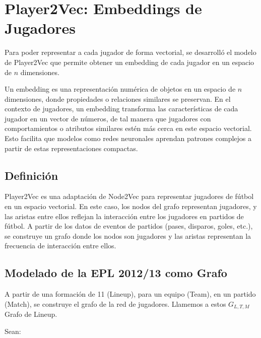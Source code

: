 \documentclass[
  a4paper,
]{article}
\begin{document}
\newpage

\hypertarget{player2vec-embeddings-de-jugadores}{%
\section{\texorpdfstring{\textbf{Player2Vec}: Embeddings de
Jugadores}{Player2Vec: Embeddings de Jugadores}}\label{player2vec-embeddings-de-jugadores}}

Para poder representar a cada jugador de forma vectorial, se desarrolló
el modelo de Player2Vec que permite obtener un embedding de cada jugador
en un espacio de \(n\) dimensiones.

Un embedding es una representación numérica de objetos en un espacio de
\(n\) dimensiones, donde propiedades o relaciones similares se
preservan. En el contexto de jugadores, un embedding transforma las
características de cada jugador en un vector de números, de tal manera
que jugadores con comportamientos o atributos similares estén más cerca
en este espacio vectorial. Esto facilita que modelos como redes
neuronales aprendan patrones complejos a partir de estas
representaciones compactas.

\hypertarget{definiciuxf3n}{%
\subsection{Definición}\label{definiciuxf3n}}

Player2Vec es una adaptación de Node2Vec para representar jugadores de
fútbol en un espacio vectorial. En este caso, los nodos del grafo
representan jugadores, y las aristas entre ellos reflejan la interacción
entre los jugadores en partidos de fútbol. A partir de los datos de
eventos de partidos (pases, disparos, goles, etc.), se construye un
grafo donde los nodos son jugadores y las aristas representan la
frecuencia de interacción entre ellos.

\hypertarget{modelado-de-la-epl-201213-como-grafo}{%
\subsection{Modelado de la EPL 2012/13 como
Grafo}\label{modelado-de-la-epl-201213-como-grafo}}

A partir de una formación de 11 (Lineup), para un equipo (Team), en un
partido (Match), se construye el grafo de la red de jugadores. Llamemos
a estos \(G_{L, T, M}\) Grafo de Lineup.

Sean:
\end{document}

